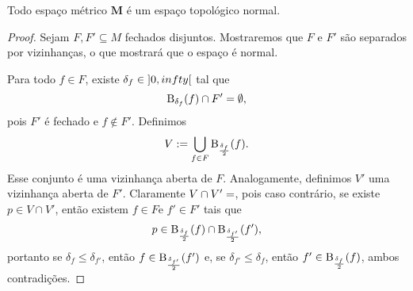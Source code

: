 \begin{proposition}
Todo espaço métrico $\bm M$ é um espaço topológico normal.
\end{proposition}
\begin{proof}
Sejam $F,F' \subseteq M$ fechados disjuntos. Mostraremos que $F$ e $F'$ são
separados por vizinhanças, o que mostrará que o espaço é normal.

Para todo $f \in F$, existe $\delta_f \in \left]{0},{infty}\right[$ tal que
	\begin{equation*}
	\mathrm{B}_{\delta_f}(f) \cap F' = \emptyset,
	\end{equation*}
pois $F'$ é fechado e $f \notin F'$. Definimos
	\begin{equation*}
	V := \bigcup_{f \in F} \mathrm{B}_{\frac{\delta_f}{2}}(f).
	\end{equation*}
Esse conjunto é uma vizinhança aberta de $F$. Analogamente, definimos $V'$ uma vizinhança aberta de $F'$. Claramente $V \cap V'=\empty$, pois caso contrário, se existe $p \in V \cap V'$, então existem $f \in F$e $f' \in F'$ tais que
	\begin{equation*}
	p \in \mathrm{B}_{\frac{\delta_f}{2}}(f) \cap \mathrm{B}_{\frac{\delta_{f'}}{2}}(f'),
	\end{equation*}
portanto se $\delta_f \leq \delta_{f'}$, então $f \in \mathrm{B}_{\frac{\delta_{f'}}{2}}(f')$ e, se $\delta_{f'} \leq \delta_f$, então $f' \in \mathrm{B}_{\frac{\delta_f}{2}}(f)$, ambos contradições.
%
\end{proof}

